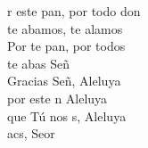 \begin{cancion}%
	r este pan, por todo don\\
	te abamos, te alamos\\
	Por te pan, por todos\\
	te abas Señ\\
	\jump
	Gracias Señ, Aleluya\\
	por este n Aleluya\\
	que Tú nos s, Aleluya\\
	acs, Seor\\
\end{cancion}%

